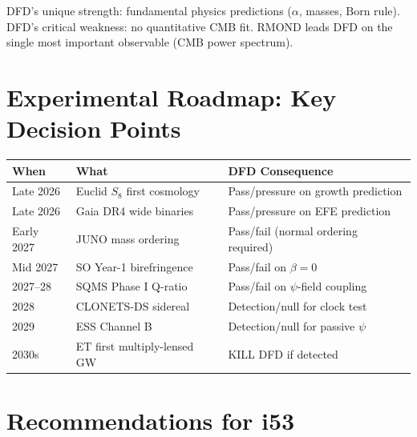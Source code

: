 \documentclass[11pt,a4paper]{article}
\begin{document}
DFD's unique strength: fundamental physics predictions ($\alpha$, masses, Born rule). DFD's critical weakness: no quantitative CMB fit. RMOND leads DFD on the single most important observable (CMB power spectrum).


\section{Experimental Roadmap: Key Decision Points}

\begin{center}
\begin{tabular}{lll}
\toprule
\textbf{When} & \textbf{What} & \textbf{DFD Consequence} \\
\midrule
Late 2026 & Euclid $S_8$ first cosmology & Pass/pressure on growth prediction \\
Late 2026 & Gaia DR4 wide binaries & Pass/pressure on EFE prediction \\
Early 2027 & JUNO mass ordering & Pass/fail (normal ordering required) \\
Mid 2027 & SO Year-1 birefringence & Pass/fail on $\beta = 0$ \\
2027--28 & SQMS Phase I Q-ratio & Pass/fail on $\psi$-field coupling \\
2028 & CLONETS-DS sidereal & Detection/null for clock test \\
2029 & ESS Channel B & Detection/null for passive $\psi$ \\
2030s & ET first multiply-lensed GW & KILL DFD if detected \\
\bottomrule
\end{tabular}
\end{center}


\section{Recommendations for i53}
\end{document}
